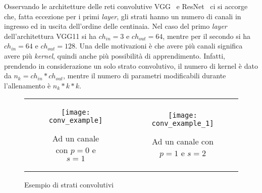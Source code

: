 Osservando le architetture delle reti convolutive VGG~\cite{vgg} e ResNet~\cite{resnet} ci si accorge che, fatta eccezione per i primi \textit{layer}, gli strati hanno un numero di canali in ingresso ed in uscita dell'ordine delle centinaia.
Nel caso del primo \textit{layer} dell'architettura VGG11 si ha $ch_{in} = 3$ e $ch_{out} = 64$, mentre per il secondo si ha $ch_{in} = 64$ e $ch_{out} = 128$.
Una delle motivazioni è che avere più canali significa avere più \textit{kernel}, quindi anche più possibilità di apprendimento.
Infatti, prendendo in considerazione un solo strato convolutivo, il numero di kernel è dato da $n_k = ch_{in}*ch_{out}$, mentre il numero di parametri modificabili durante l'allenamento è $n_k * k * k$.

\begin{figure}[ht]
  \begin{center}
  \begin{tabular}{cc}
    \begin{subfigure}{.45\linewidth}
      \centering\texttt{[image: conv\_example]}
      \caption{Ad un canale con $p=0$ e $s=1$}
      \label{fig:conv_layer_1ch}
    \end{subfigure} &

    \begin{subfigure}{.45\linewidth}
      \centering\texttt{[image: conv\_example\_1]}
      \caption{Ad un canale con $p=1$ e $s=2$}
      \label{fig:conv_layer_1ch_p1_s2}
    \end{subfigure}


  \end{tabular}
  \caption{Esempio di strati convolutivi}
  \label{fig:conv_layer}
  \end{center}
\end{figure}

